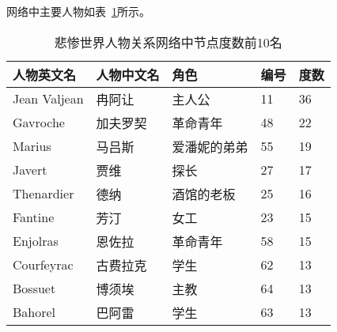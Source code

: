 网络中主要人物如表~\ref{tab:lesmisNodeMap}所示。
\begin{table}[!htb]
	\begin{minipage}[t]{1\linewidth}
		\centering
		\caption{悲惨世界人物关系网络中节点度数前10名}
		\label{tab:lesmisNodeMap}
		\begin{tabular}{p{}<{\centering}p{}<{\centering}p{}<{\centering}p{}<{\centering}p{}<{\centering}}
			\toprule[1.5pt]
			{\heiti 人物英文名} & {\heiti 人物中文名} & {\heiti 角色} & {\heiti 编号} & {\heiti 度数} \\\midrule[1pt]
			Jean Valjean & 冉阿让 & 主人公 & 11 & 36 \\ 
			Gavroche & 加夫罗契 & 革命青年 & 48 & 22 \\ 
			Marius & 马吕斯 & 爱潘妮的弟弟 & 55 & 19 \\ 
			Javert & 贾维 & 探长 & 27 & 17 \\ 
			Thenardier & 德纳 & 酒馆的老板 & 25 & 16 \\ 
			Fantine & 芳汀 & 女工 & 23 & 15 \\ 
			Enjolras & 恩佐拉 & 革命青年 & 58 & 15 \\ 
			Courfeyrac & 古费拉克 & 学生 & 62 & 13 \\ %
			Bossuet & 博须埃 & 主教 & 64 & 13 \\ 
			Bahorel & 巴阿雷 & 学生 & 63 & 13 \\
			\bottomrule[1.5pt]
		\end{tabular}
	\end{minipage}
\end{table}

